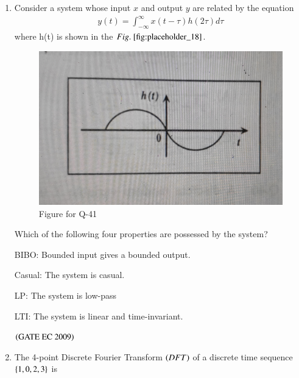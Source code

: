 \documentclass[journal,12pt,onecolumn]{IEEEtran}
\theoremstyle{remark}
\begin{document}
\begin{enumerate}[start=1, label={Q\arabic*.}]
\item Consider a system whose input $x$ and output $y$ are related by the equation 
\begin{align*}
    y(t)= \int_{-\infty}^{\infty} x(t-\tau)h(2\tau)d\tau
\end{align*}
where h(t) is shown in the $\figref{fig:placeholder_18}$.
\begin{figure}[H]
    \centering
    \includegraphics[width=0.5\columnwidth]{figs/img_18.jpg}
    \caption{Figure for Q-41}
    \label{fig:placeholder_18}
\end{figure}

Which of the following four properties are possessed by the system?

BIBO: Bounded input gives a bounded output.

Casual: The system is casual.

LP: The system is low-pass

LTI: The system is linear and time-invariant.
\begin{enumerate}
\end{enumerate}
\hfill $\left(\text{GATE EC 2009}\right)$

\item The 4-point Discrete Fourier Transform $\left(DFT\right)$ of a discrete time sequence $\left\{1,0,2,3\right\}$ is 
\begin{enumerate}
\end{enumerate}
\end{enumerate}
\end{document}
